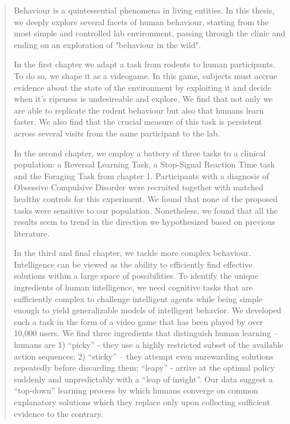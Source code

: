 \documentclass[11pt]{article}
\begin{document}
\begin{abstract}
  Behaviour is a quintessential phenomena in living entities. In this thesis, we deeply explore several facets of human behaviour, starting from the most simple and controlled lab environment, passing through the clinic and ending on an exploration of "behaviour in the wild".

  In the first chapter we adapt a task from rodents to human participants. To do so, we shape it as a videogame. In this game, subjects must accrue evidence about the state of the environment by exploiting it and decide when it's ripeness is undesireable and explore. We find that not only we are able to replicate the rodent behaviour but also that humans learn faster. We also find that the crucial measure of this task is persistent across several visits from the same participant to the lab.

  In the second chapter, we employ a battery of three tasks to a clinical population: a Reversal Learning Task, a Stop-Signal Reaction Time task and the Foraging Task from chapter 1. Participants with a diagnosis of Obsessive Compulsive Disorder were recruited together with matched healthy controls for this experiment. We found that none of the proposed tasks were sensitive to our population. Nonetheless, we found that all the results seem to trend in the direction we hypothesized based on previous literature.

  In the third and final chapter, we tackle more complex behaviour. Intelligence can be viewed as the ability to efficiently find effective solutions within a large space of possibilities. To identify the unique ingredients of human intelligence, we need cognitive tasks that are sufficiently complex to challenge intelligent agents while being simple enough to yield generalizable models of intelligent behavior. We developed such a task in the form of a video game that has been played by over 10,000 users. We find three ingredients that distinguish human learning – humans are 1) “picky” - they use a highly restricted subset of the available action sequences; 2) “sticky” – they attempt even unrewarding solutions repeatedly before discarding them; “leapy” - arrive at the optimal policy suddenly and unpredictably with a “leap of insight”. Our data suggest a “top-down” learning process by which humans converge on common explanatory solutions which they replace only upon collecting sufficient evidence to the contrary.

\end{abstract}
\clearpage
\end{document}
